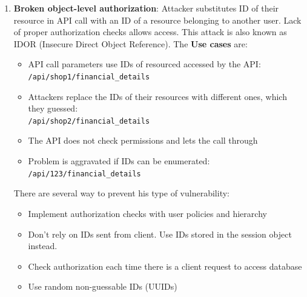 \documentclass[10pt,a4paper]{report}
\begin{document}
\begin{enumerate}
	\item \textbf{Broken object-level authorization}: Attacker substitutes ID of their resource in API call with an ID of a resource belonging to another user. Lack of proper authorization checks allows access. This attack is also known as IDOR (Insecure
	Direct Object Reference). The \textbf{Use cases} are:
	\begin{itemize}
		\item API call parameters use IDs of resourced accessed by the API:
		\texttt{/api/shop1/financial\_details}
		\item Attackers replace the IDs of their resources with different ones,
		which they guessed:\\
		\texttt{/api/shop2/financial\_details}
		\item The API does not check permissions and lets the call through
		\item Problem is aggravated if IDs can be enumerated:
		\texttt{/api/123/financial\_details}
	\end{itemize}
	There are several way to prevent his type of vulnerability:
	\begin{itemize}
		\item Implement authorization checks with user policies and hierarchy
		\item Don’t rely on IDs sent from client. Use IDs stored in the session
		object instead.
		\item Check authorization each time there is a client request to
		access database
		\item Use random non-guessable IDs (UUIDs)
	\end{itemize}


\end{enumerate}
\end{document}
